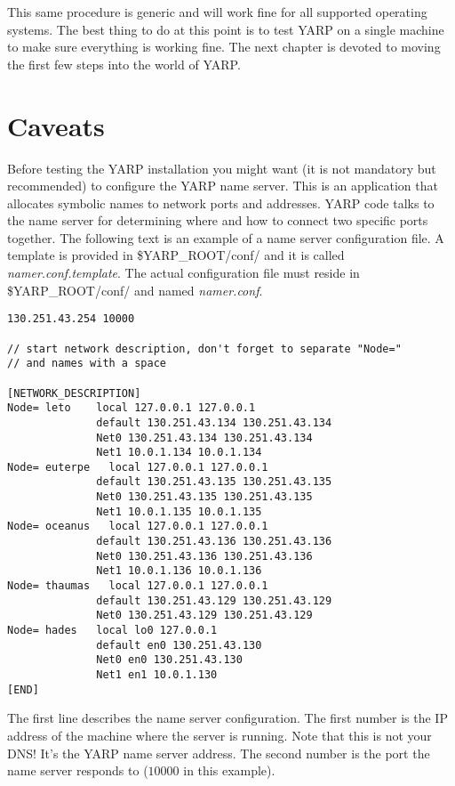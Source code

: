 This same procedure is generic and will work fine for all supported operating systems. The best thing to do at this point is to test YARP on a single machine to make sure everything is working fine. The next chapter is devoted to moving the first few steps into the world of YARP.


\section{Caveats}
\label{sect:caveats}

Before testing the YARP installation you might want (it is not mandatory but recommended) to configure the YARP name server. This is an application that allocates symbolic names to network ports and addresses. YARP code talks to the name server for determining where and how to connect two specific ports together. The following text is an example of a name server configuration file. A template is provided in \$YARP\_ROOT/conf/ and it is called {\em namer.conf.template}. The actual configuration file must reside in \$YARP\_ROOT/conf/ and named {\em namer.conf}.

\begin{verbatim}
130.251.43.254 10000

// start network description, don't forget to separate "Node=" 
// and names with a space

[NETWORK_DESCRIPTION]
Node= leto    local 127.0.0.1 127.0.0.1	
              default 130.251.43.134 130.251.43.134	
              Net0 130.251.43.134 130.251.43.134	
              Net1 10.0.1.134 10.0.1.134
Node= euterpe	local 127.0.0.1 127.0.0.1	
              default 130.251.43.135 130.251.43.135	
              Net0 130.251.43.135 130.251.43.135	
              Net1 10.0.1.135 10.0.1.135
Node= oceanus	local 127.0.0.1 127.0.0.1	
              default 130.251.43.136 130.251.43.136	
              Net0 130.251.43.136 130.251.43.136	
              Net1 10.0.1.136 10.0.1.136
Node= thaumas	local 127.0.0.1 127.0.0.1	
              default 130.251.43.129 130.251.43.129	
              Net0 130.251.43.129 130.251.43.129
Node= hades   local lo0 127.0.0.1		
              default en0 130.251.43.130			
              Net0 en0 130.251.43.130			
              Net1 en1 10.0.1.130
[END]
\end{verbatim}

The first line describes the name server configuration. The first number is the IP address of the machine where the server is running. Note that this is not your DNS! It's the YARP name server address. The second number is the port the name server responds to ($10000$ in this example).

